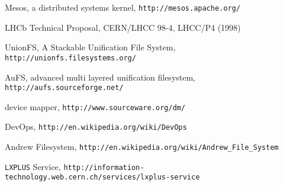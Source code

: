 \documentclass[a4paper]{jpconf}
\begin{document}
\begin{thebibliography}{9}
	 Mesos, a distributed systems kernel,
		\verb'http://mesos.apache.org/'

	 LHCb Technical Proposal, CERN/LHCC 98-4, LHCC/P4 (1998)

	 UnionFS, A Stackable Unification File System, 
		\verb'http://unionfs.filesystems.org/'

	 AuFS, advanced multi layered unification filesystem,
		\verb'http://aufs.sourceforge.net/'

	 device mapper,
		\verb'http://www.sourceware.org/dm/'

	 DevOps,
		\verb'http://en.wikipedia.org/wiki/DevOps'

	 Andrew Filesystem,
		\verb'http://en.wikipedia.org/wiki/Andrew_File_System'

	 \texttt{LXPLUS} Service,
		\verb'http://information-technology.web.cern.ch/services/lxplus-service'

\end{thebibliography}
\end{document}
